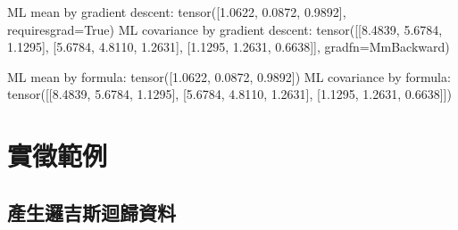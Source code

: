 \documentclass[letterpaper,10pt,english]{sphinxmanual}
\begin{document}
\begin{sphinxVerbatim}[commandchars=\\\{\}]
ML mean by gradient descent: 
 tensor([\PYGZhy{}1.0622, \PYGZhy{}0.0872,  0.9892], requires\PYGZus{}grad=True)
ML covariance by gradient descent: 
 tensor([[8.4839, 5.6784, 1.1295],
        [5.6784, 4.8110, 1.2631],
        [1.1295, 1.2631, 0.6638]], grad\PYGZus{}fn=\PYGZlt{}MmBackward\PYGZgt{})
\end{sphinxVerbatim}

\begin{sphinxVerbatim}[commandchars=\\\{\}]
     
        
     
\end{sphinxVerbatim}

\begin{sphinxVerbatim}[commandchars=\\\{\}]
ML mean by formula: 
 tensor([\PYGZhy{}1.0622, \PYGZhy{}0.0872,  0.9892])
ML covariance by formula: 
 tensor([[8.4839, 5.6784, 1.1295],
        [5.6784, 4.8110, 1.2631],
        [1.1295, 1.2631, 0.6638]])
\end{sphinxVerbatim}


\section{實徵範例}
\label{\detokenize{notebook/lab-torch-mle:id2}}

\subsection{產生邏吉斯迴歸資料}
\label{\detokenize{notebook/lab-torch-mle:id3}}
\begin{sphinxVerbatim}[commandchars=\\\{\}]
\end{sphinxVerbatim}
\end{document}
